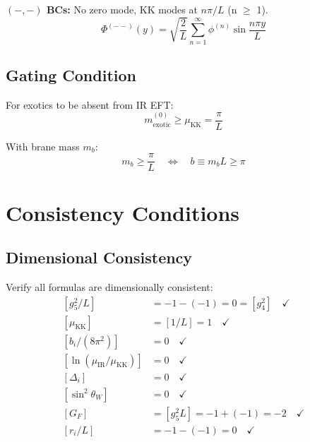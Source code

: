 \documentclass[11pt,a4paper]{article}
\begin{document}
\textbf{$(-,-)$ BCs:} No zero mode, KK modes at $n\pi/L$ (n $\geq$ 1).
\begin{equation}
\label{eq:mm-bc}
\Phi^{(--)}(y) = \sqrt{\frac{2}{L}}\sum_{n=1}^{\infty}\phi^{(n)}\sin\frac{n\pi y}{L}
\end{equation}

\subsection{Gating Condition}
\label{app:gating-condition}

For exotics to be absent from IR EFT:
\begin{equation}
\label{eq:gating-condition-app}
m_{\text{exotic}}^{(0)} \geq \mu_{\text{KK}} = \frac{\pi}{L}
\end{equation}

With brane mass $m_b$:
\begin{equation}
\label{eq:brane-mass-condition}
m_b \geq \frac{\pi}{L} \quad \Leftrightarrow \quad b \equiv m_b L \geq \pi
\end{equation}

\section{Consistency Conditions}
\label{app:consistency}

\subsection{Dimensional Consistency}
\label{app:dim-checks}

Verify all formulas are dimensionally consistent:
\begin{align}
\label{eq:dim-check-1}
[g_5^2/L] &= -1 - (-1) = 0 = [g_4^2] \quad \checkmark \\
\label{eq:dim-check-2}
[\mu_{\text{KK}}] &= [1/L] = 1 \quad \checkmark \\
\label{eq:dim-check-3}
[b_i/(8\pi^2)] &= 0 \quad \checkmark \\
\label{eq:dim-check-4}
[\ln(\mu_{\text{IR}}/\mu_{\text{KK}})] &= 0 \quad \checkmark \\
\label{eq:dim-check-5}
[\Delta_i] &= 0 \quad \checkmark \\
\label{eq:dim-check-6}
[\sin^2\theta_W] &= 0 \quad \checkmark \\
\label{eq:dim-check-7}
[G_F] &= [g_5^2 L] = -1 + (-1) = -2 \quad \checkmark \\
\label{eq:dim-check-8}
[r_i/L] &= -1 - (-1) = 0 \quad \checkmark
\end{align}
\end{document}
